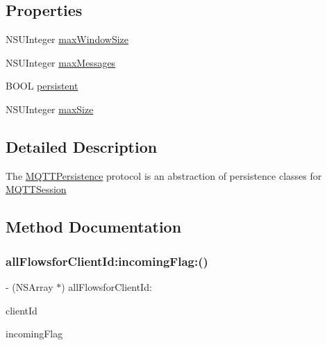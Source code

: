 \subsection*{Properties}
\begin{DoxyCompactItemize}
\item 
N\+S\+U\+Integer \hyperlink{protocol_m_q_t_t_persistence-p_a7566c5b7fff68c034ffd836c32d1b822}{max\+Window\+Size}
\item 
N\+S\+U\+Integer \hyperlink{protocol_m_q_t_t_persistence-p_a25da1e10303f72b9f5c0acded51780d2}{max\+Messages}
\item 
B\+O\+OL \hyperlink{protocol_m_q_t_t_persistence-p_abe825bce839eb0d41e4b7428893ad8b8}{persistent}
\item 
N\+S\+U\+Integer \hyperlink{protocol_m_q_t_t_persistence-p_a9803a6b662157637e28949766186c3d5}{max\+Size}
\end{DoxyCompactItemize}


\subsection{Detailed Description}
The \hyperlink{protocol_m_q_t_t_persistence-p}{M\+Q\+T\+T\+Persistence} protocol is an abstraction of persistence classes for \hyperlink{interface_m_q_t_t_session}{M\+Q\+T\+T\+Session} 

\subsection{Method Documentation}
\mbox{\label{protocol_m_q_t_t_persistence-p_a513e62e567e187ce73fab26f53d2272a}} 
\subsubsection{\texorpdfstring{all\+Flowsfor\+Client\+Id\+:incoming\+Flag\+:()}{allFlowsforClientId:incomingFlag:()}}
{\footnotesize\ttfamily -\/ (N\+S\+Array $\ast$) all\+Flowsfor\+Client\+Id\+: \begin{DoxyParamCaption}\item[{(N\+S\+String $\ast$)}]{client\+Id }\item[{incomingFlag:(B\+O\+OL)}]{incoming\+Flag }\end{DoxyParamCaption}}


